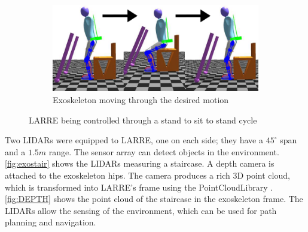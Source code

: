 \begin{figure}[h!]
\begin{subfigure}{0.5\textwidth}
\end{subfigure}
    \begin{subfigure}{0.5\textwidth}
        \centering
        \includegraphics[scale=.5]{images/sim/sit_to_stand2 (1).png}
        \caption{Exoskeleton moving through the desired motion}
    \label{fig:sit2stand}
\end{subfigure}
    \caption[LARRE Simulation standing to sit motion]{LARRE being controlled through a stand to sit to stand cycle}
    \label{fig:simwalking}
\end{figure}
 
 
 
 Two LIDARs were equipped to LARRE, one on each side; they have a $45^{\circ}$ span and a $1.5m$ range. The sensor array can detect objects in the environment. \autoref{fig:exostair} shows the LIDARs measuring a staircase. A depth camera is attached to the exoskeleton hips. The camera produces a rich 3D point cloud, which is transformed into LARRE's frame using the PointCloudLibrary \cite{Rusu_ICRA2011_PCL}.  \autoref{fig:DEPTH} shows the point cloud of the staircase in the exoskeleton frame. The LIDARs allow the sensing of the environment, which can be used for path planning and navigation. 

